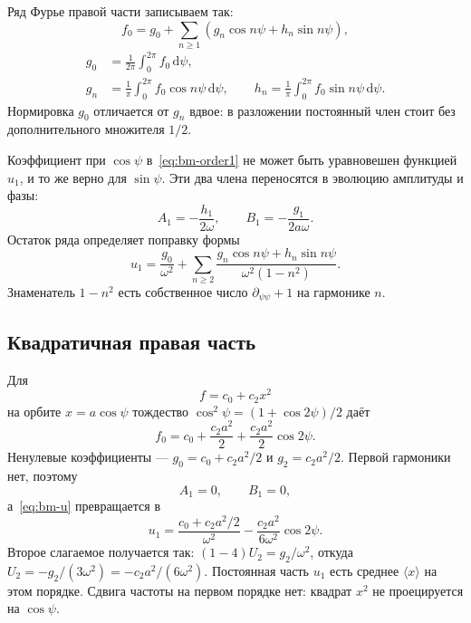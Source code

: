 Ряд Фурье правой части записываем так:
\begin{equation}
\label{eq:bm-fourier}
f_0=g_0+\sum_{n\ge 1}(g_n\cos n\psi+h_n\sin n\psi),
\end{equation}
\begin{equation}
\label{eq:bm-fourier-coeff}
\begin{aligned}
g_0&=\frac{1}{2\pi}\int_0^{2\pi}f_0\,\mathrm{d}\psi,\\
g_n&=\frac{1}{\pi}\int_0^{2\pi}f_0\cos n\psi\,\mathrm{d}\psi,
\qquad
h_n=\frac{1}{\pi}\int_0^{2\pi}f_0\sin n\psi\,\mathrm{d}\psi.
\end{aligned}
\end{equation}
Нормировка $g_0$ отличается от $g_n$ вдвое: в разложении постоянный член стоит без дополнительного множителя $1/2$.

Коэффициент при $\cos\psi$ в~\eqref{eq:bm-order1} не может быть уравновешен функцией $u_1$, и то же верно для $\sin\psi$. Эти два члена переносятся в эволюцию амплитуды и фазы:
\begin{equation}
\label{eq:bm-ab}
A_1=-\frac{h_1}{2\omega},
\qquad
B_1=-\frac{g_1}{2a\omega}.
\end{equation}
Остаток ряда определяет поправку формы
\begin{equation}
\label{eq:bm-u}
u_1=\frac{g_0}{\omega^2}
+\sum_{n\ge 2}\frac{g_n\cos n\psi+h_n\sin n\psi}{\omega^2(1-n^2)}.
\end{equation}
Знаменатель $1-n^2$ есть собственное число $\partial_{\psi\psi}+1$ на гармонике $n$.

\subsection{Квадратичная правая часть}
\label{sec:bm-quad}

Для
\begin{equation}
\label{eq:bm-quad-f}
f=c_0+c_2 x^2
\end{equation}
на орбите $x=a\cos\psi$ тождество $\cos^2\psi=(1+\cos 2\psi)/2$ даёт
\begin{equation}
\label{eq:bm-f0}
f_0=c_0+\frac{c_2 a^2}{2}+\frac{c_2 a^2}{2}\cos 2\psi.
\end{equation}
Ненулевые коэффициенты --- $g_0=c_0+c_2 a^2/2$ и $g_2=c_2 a^2/2$. Первой гармоники нет, поэтому
\begin{equation}
\label{eq:bm-ab1-zero}
A_1=0,
\qquad
B_1=0,
\end{equation}
а~\eqref{eq:bm-u} превращается в
\begin{equation}
\label{eq:bm-u1}
u_1
=\frac{c_0+c_2 a^2/2}{\omega^2}
-\frac{c_2 a^2}{6\omega^2}\cos 2\psi.
\end{equation}
Второе слагаемое получается так: $(1-4)U_2=g_2/\omega^2$, откуда $U_2=-g_2/(3\omega^2)=-c_2 a^2/(6\omega^2)$. Постоянная часть $u_1$ есть среднее $\langle x\rangle$ на этом порядке. Сдвига частоты на первом порядке нет: квадрат $x^2$ не проецируется на $\cos\psi$.

